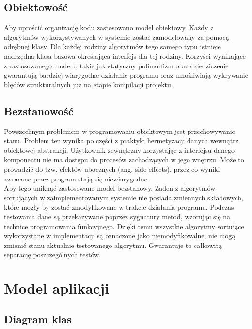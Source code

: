 \subsection{Obiektowość}
Aby uprościć organizację kodu zastosowano model obiektowy. Każdy z algorytmów wykorzystywanych w systemie
został zamodelowany za pomocą odrębnej klasy. Dla każdej rodziny algorytmów tego samego typu istnieje
nadrzędna klasa bazowa określająca interfejs dla tej rodziny. Korzyści wynikające z zastosowanego
modelu, takie jak statyczny polimorfizm oraz dziedziczenie gwarantują bardziej wiarygodne działanie programu
oraz umożliwiają wykrywanie błędów strukturalnych już na etapie kompilacji projektu.

\subsection{Bezstanowość}
Powszechnym problemem w programowaniu obiektowym jest przechowywanie stanu. Problem ten wynika po części
z praktyki hermetyzacji danych wewnątrz obiektowej abstrakcji. Użytkownik zewnętrzny korzystając z interfejsu
danego komponentu nie ma dostępu do procesów zachodzących w jego wnętrzu. Może to prowadzić do tzw. efektów
ubocznych (ang. side effects), przez co wyniki zwracane przez program stają się niewiarygodne.\\

Aby tego uniknąć zastosowano model bezstanowy. Żaden z algorytmów sortujących w zaimplementowanym systemie
nie posiada zmiennych składowych, które mogły by zostać zmodyfikowane w trakcie działania programu. Podczas
testowania dane są przekazywane poprzez sygnatury metod, wzorując się na technice programowania funkcyjnego.
Dzięki temu wszystkie algorytmy sortujące wykorzystane w implementacji są oznaczone jako niemodyfikowalne,
nie mogą zmienić stanu aktualnie testowanego algorytmu. Gwarantuje to całkowitą separację poszczególnych testów.

\section{Model aplikacji}

\subsection{Diagram klas}

\begin{figure}[H]
	\centering
	
\end{figure}

